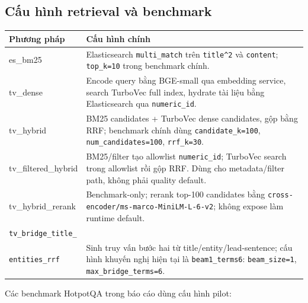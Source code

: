 \documentclass[11pt,a4paper]{article}
\newcommand{\bridgecell}{\texttt{tv\_bridge\_title\_}\\\texttt{entities\_rrf}}
\begin{document}
\subsection{Cấu hình retrieval và benchmark}

\small
\begin{tabularx}{\textwidth}{>{\ttfamily\raggedright\arraybackslash}p{} Y}
\toprule
Phương pháp & Cấu hình chính \\
\midrule
es\_bm25 & Elasticsearch \texttt{multi\_match} trên \texttt{title\^{}2} và \texttt{content}; \texttt{top\_k=10} trong benchmark chính. \\
tv\_dense & Encode query bằng BGE-small qua embedding service, search TurboVec full index, hydrate tài liệu bằng Elasticsearch qua \texttt{numeric\_id}. \\
tv\_hybrid & BM25 candidates + TurboVec dense candidates, gộp bằng RRF; benchmark chính dùng \texttt{candidate\_k=100}, \texttt{num\_candidates=100}, \texttt{rrf\_k=30}. \\
tv\_filtered\_hybrid & BM25/filter tạo allowlist \texttt{numeric\_id}; TurboVec search trong allowlist rồi gộp RRF. Dùng cho metadata/filter path, không phải quality default. \\
tv\_hybrid\_rerank & Benchmark-only; rerank top-100 candidates bằng \texttt{cross-encoder/ms-marco-MiniLM-L-6-v2}; không expose làm runtime default. \\
\bridgecell & Sinh truy vấn bước hai từ title/entity/lead-sentence; cấu hình khuyến nghị hiện tại là \texttt{beam1\_terms6}: \texttt{beam\_size=1}, \texttt{max\_bridge\_terms=6}. \\
\bottomrule
\end{tabularx}
\normalsize

Các benchmark HotpotQA trong báo cáo dùng cấu hình pilot:

\begin{center}
\end{center}
\end{document}
